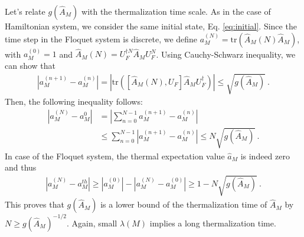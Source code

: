 \documentclass[twocolumn,superscriptaddress, prl,showpacs]{revtex4-1}
\begin{document}
Let's relate $g(\hat{A}_M) $ with the thermalization time scale.
As in the case of Hamiltonian system, we consider the same initial state, Eq. \eqref{eq:initial}.
Since the time step in the Floquet system is discrete, we define $a_M^{(N)} = \mathrm{tr}(\hat{A}_M(N)\hat{A}_M )$, with
$a_M^{(0)} = 1$ and $\hat{A}_M(N) = U_F^{\dag N}\hat{A}_M U_F^N$. Using Cauchy-Schwarz inequality, we can show that
\begin{align}
|a_M^{(n+1)} - a_M^{(n)}| = |\mathrm{tr}([\hat{A}_M(N),U_F]\hat{A}_M U_F^{\dag})| \leq \sqrt{g(\hat{A}_M) } ~.
\end{align}
Then, the following inequality follows:
\begin{align}
|a_M^{(N)} - a_M^{0}| &= \left|\sum_{n=0}^{N-1}a_M^{(n+1)} - a_M^{(n)}\right| \nonumber\\
&\leq \sum_{n = 0}^{N-1}|a_M^{(n+1)} - a_M^{(n)}| \leq N \sqrt{g(\hat{A}_M) } ~.
\end{align}
In case of the Floquet system, the thermal expectation value $\hat{a}_M$ is indeed zero and thus
\begin{align}
|a_M^{(N)} - a_M^{th}| \geq |a_M^{(0)}| - |a_M^{(N)} - a_M^{(0)}| \geq 1 - N \sqrt{g(\hat{A}_M) } ~.
\label{eq:floquet_timescale}
\end{align}
This proves that $g(\hat{A}_M)$ is a lower bound of the thermalization time of $\hat{A}_M$ by
$N \geq g(\hat{A}_M) ^{-1/2}$. Again, small $\lambda(M)$ implies a long thermalization time.
\end{document}
